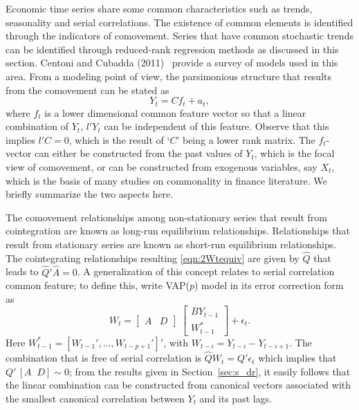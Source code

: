 Economic time series share some common characteristics such as trends, seasonality and serial correlations. The existence of common elements is identified through the indicators of comovement. Series that have common stochastic trends can be identified through reduced-rank regression methods as discussed in this section. Centoni and Cubadda (2011)~\cite{centoni} provide a survey of models used in this area. From a modeling point of view, the parsimonious structure that results from the comovement can be stated as
	\begin{equation} \label{eqn:discyt}
	Y_t= Cf_t + a_t,
	\end{equation}  
where $f_t$ is a lower dimensional common feature vector so that a linear combination of $Y_t$, $l' Y_t$ can be independent of this feature. Observe that this implies $l'C=0$, which is the result of `$C$' being a lower rank matrix. The $f_t$-vector can either be constructed from the past values of $Y_t$, which is the focal view of comovement, or can be constructed from exogenous variables, say $X_t$, which is the basis of many studies on commonality in finance literature. We briefly summarize the two aspects here. 


The comovement relationships among non-stationary series that result from cointegration are known as long-run equilibrium relationships. Relationships that result from stationary series are known as short-run equilibrium relationships. The cointegrating relationships resulting \eqref{eqn:2Wtequiv} are given by $\hat{Q}$ that leads to $\hat{Q}' \hat{A}=0$. A generalization of this concept relates to serial correlation common feature; to define this, write VAP($p$) model in its error correction form as\label{in:vec2}
	\begin{equation} \label{eqn:2WteqAD}
	W_t=  \begin{bmatrix} A & D \end{bmatrix} \; \begin{bmatrix} BY_{t-1} \\ W_{t-1}^* \end{bmatrix} + \epsilon_t.
	\end{equation}
Here $W_{t-1}^*= [W_{t-1}', \ldots, W_{t-p+1}']'$, with $W_{t-i}= Y_{t-i} - Y_{t-i+1}$. The combination that is free of serial correlation is $\hat{Q} W_t= Q' \epsilon_t$ which implies that $Q' \,[A \;\; D] \sim 0$; from the results given in Section~\ref{sec:s_dr}, it easily follows that the linear combination can be constructed from canonical vectors associated with the smallest canonical correlation between $Y_t$ and its past lags.\label{in:coint2}\label{in:comove2}



